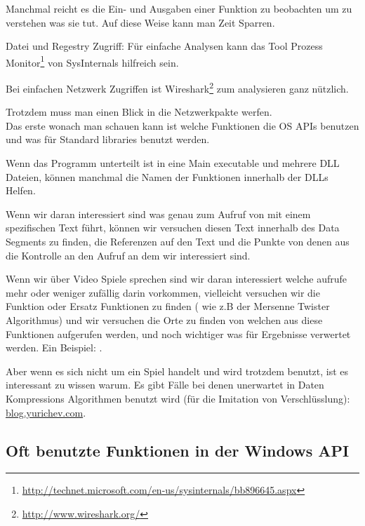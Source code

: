 
Manchmal reicht es die Ein- und Ausgaben einer Funktion zu beobachten um zu verstehen was sie tut.
Auf diese Weise kann man Zeit Sparren.

Datei und Regestry Zugriff:
F\"ur einfache Analysen kann das Tool Prozess Monitor\footnote{\url{http://technet.microsoft.com/en-us/sysinternals/bb896645.aspx}}
von SysInternals hilfreich sein.

Bei einfachen Netzwerk Zugriffen ist Wireshark\footnote{\url{http://www.wireshark.org/}} zum analysieren ganz n\"utzlich.

Trotzdem muss man einen Blick in die Netzwerkpakte werfen.
\\
Das erste wonach man schauen kann ist welche Funktionen die \ac{OS} \ac{API}s benutzen und was f\"ur Standard libraries
benutzt werden. 

Wenn das Programm unterteilt ist in eine Main executable und mehrere DLL Dateien, k\"onnen manchmal die Namen der Funktionen innerhalb
der DLLs Helfen. 

Wenn wir daran interessiert sind was genau zum Aufruf von  mit einem spezifischen Text f\"uhrt,
k\"onnen wir versuchen diesen Text innerhalb des Data Segments zu finden, die Referenzen auf den Text und die 
Punkte von denen aus die Kontrolle an den  Aufruf an dem wir interessiert sind. %

Wenn wir \"uber Video Spiele sprechen sind wir daran interessiert welche \rand aufrufe mehr oder weniger zuf\"allig darin vorkommen,
vielleicht versuchen wir die \rand Funktion oder Ersatz Funktionen zu finden ( wie z.B der Mersenne Twister Algorithmus) 
und wir versuchen die Orte zu finden von welchen aus diese Funktionen aufgerufen werden, und noch wichtiger was f\"ur
Ergebnisse verwertet werden. 
Ein Beispiel: .

Aber wenn es sich nicht um ein Spiel handelt und \rand wird trotzdem benutzt, ist es interessant zu wissen warum.
Es gibt F\"alle bei denen unerwartet \rand in Daten Kompressions Algorithmen benutzt wird (f\"ur die Imitation von Verschl\"usslung):
\href{http://blog.yurichev.com/node/44}{blog.yurichev.com}.

\subsection{Oft benutzte Funktionen in der Windows API}

